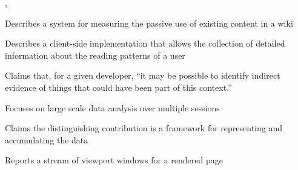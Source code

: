 \begin{albResearchNote}{%
    \citet{dekel07:_framew_study_use_wikis_knowl}%
  }{%
    , %
  }
\item Describes a system for measuring the passive use of existing
  content in a wiki
\item Describes a client-side implementation that allows the collection
  of detailed information about the reading patterns of a user
\item Claims that, for a given developer, ``it may be possible to
  identify indirect evidence of things that could have been part of this
  context.''
\item Focuses on large scale data analysis over multiple sessions
\item Claims the distinguishing contribution is a framework for
  representing and accumulating the data
\item Reports a stream of viewport windows for a rendered page
\end{albResearchNote}

%
%
%




